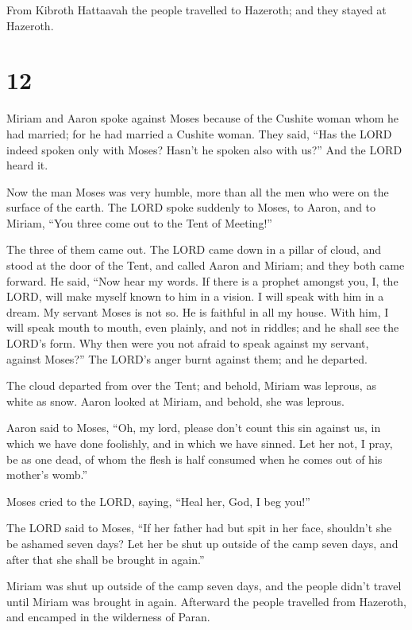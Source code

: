  From Kibroth Hattaavah the people travelled to Hazeroth;
and they stayed at Hazeroth.

\hypertarget{section-11}{%
\section{12}\label{section-11}}

 Miriam and Aaron spoke against Moses because of the Cushite
woman whom he had married; for he had married a Cushite woman.
 They said, ``Has the LORD indeed spoken only with Moses?
Hasn't he spoken also with us?'' And the LORD heard it.

 Now the man Moses was very humble, more than all the men
who were on the surface of the earth.  The LORD spoke
suddenly to Moses, to Aaron, and to Miriam, ``You three come out to the
Tent of Meeting!''

The three of them came out.  The LORD came down in a pillar
of cloud, and stood at the door of the Tent, and called Aaron and
Miriam; and they both came forward.  He said, ``Now hear my
words. If there is a prophet amongst you, I, the LORD, will make myself
known to him in a vision. I will speak with him in a dream. 
My servant Moses is not so. He is faithful in all my house. 
With him, I will speak mouth to mouth, even plainly, and not in riddles;
and he shall see the LORD's form. Why then were you not afraid to speak
against my servant, against Moses?''  The LORD's anger burnt
against them; and he departed.

 The cloud departed from over the Tent; and behold, Miriam
was leprous, as white as snow. Aaron looked at Miriam, and behold, she
was leprous.

 Aaron said to Moses, ``Oh, my lord, please don't count
this sin against us, in which we have done foolishly, and in which we
have sinned.  Let her not, I pray, be as one dead, of whom
the flesh is half consumed when he comes out of his mother's womb.''

 Moses cried to the LORD, saying, ``Heal her, God, I beg
you!''

 The LORD said to Moses, ``If her father had but spit in
her face, shouldn't she be ashamed seven days? Let her be shut up
outside of the camp seven days, and after that she shall be brought in
again.''

 Miriam was shut up outside of the camp seven days, and the
people didn't travel until Miriam was brought in again. 
Afterward the people travelled from Hazeroth, and encamped in the
wilderness of Paran.

